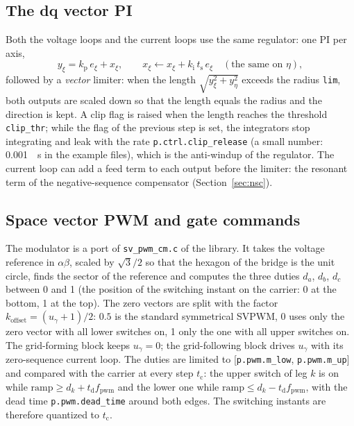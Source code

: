 \documentclass[11pt,a4paper]{scrartcl}
\newcommand{\ped}[1]{_{\mathrm{#1}}}
\newcommand{\code}[1]{\texttt{#1}}
\begin{document}
\begin{onehalfspace}
\subsection{The dq vector PI}
\label{sec:vector_pi}

Both the voltage loops and the current loops use the same regulator: one PI per axis,
\begin{equation}
	y_\xi = k\ped{p}\, e_\xi + x_\xi, \qquad x_\xi \leftarrow x_\xi + k\ped{i}\, t\ped{s}\, e_\xi \quad (\text{the same on } \eta),
	\label{eq:pi}
\end{equation}
followed by a \emph{vector} limiter: when the length $\sqrt{y_\xi^2 + y_\eta^2}$ exceeds the radius \code{lim}, both outputs are scaled down so that the length equals the radius and the direction is kept. A clip flag is raised when the length reaches the threshold \code{clip\_thr}; while the flag of the previous step is set, the integrators stop integrating and leak with the rate \code{p.ctrl.clip\_release} (a small number: \SI{0.001}{\per\second} in the example files), which is the anti-windup of the regulator. The current loop can add a feed term to each output before the limiter: the resonant term of the negative-sequence compensator (Section~\ref{sec:nsc}).

\subsection{Space vector PWM and gate commands}
\label{sec:gates}

The modulator is a port of \code{sv\_pwm\_cm.c} of the library. It takes the voltage reference in $\alpha\beta$, scaled by $\sqrt{3}/2$ so that the hexagon of the bridge is the unit circle, finds the sector of the reference and computes the three duties $d_a$, $d_b$, $d_c$ between 0 and 1 (the position of the switching instant on the carrier: 0 at the bottom, 1 at the top). The zero vectors are split with the factor $k\ped{offset} = (u_\gamma + 1)/2$: $0.5$ is the standard symmetrical SVPWM, 0 uses only the zero vector with all lower switches on, 1 only the one with all upper switches on. The grid-forming block keeps $u_\gamma = 0$; the grid-following block drives $u_\gamma$ with its zero-sequence current loop. The duties are limited to [\code{p.pwm.m\_low}, \code{p.pwm.m\_up}] and compared with the carrier at every step $t\ped{c}$: the upper switch of leg $k$ is on while $\mathrm{ramp} \ge d_k + t\ped{d} f\ped{pwm}$ and the lower one while $\mathrm{ramp} \le d_k - t\ped{d} f\ped{pwm}$, with the dead time \code{p.pwm.dead\_time} around both edges. The switching instants are therefore quantized to $t\ped{c}$.


\end{onehalfspace}
\end{document}
